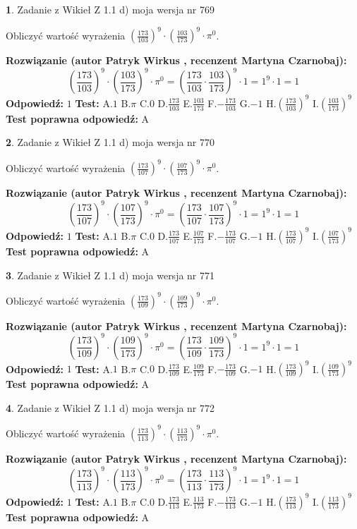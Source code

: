 \documentclass[12pt, a4paper]{article}
\theoremstyle{definition} %
\newtheorem{zad}{}
\newcommand{\zadStart}[1]{\begin{zad}#1\newline}
\newcommand{\zadStop}{\end{zad}}
\newcommand{\rozwStart}[2]{\noindent \textbf{Rozwiązanie (autor #1 , recenzent #2): }\newline}
\newcommand{\rozwStop}{\newline}
\newcommand{\odpStart}{\noindent \textbf{Odpowiedź:}\newline}
\newcommand{\odpStop}{\newline}
\newcommand{\testStart}{\noindent \textbf{Test:}\newline}
\newcommand{\testStop}{\newline}
\newcommand{\kluczStart}{\noindent \textbf{Test poprawna odpowiedź:}\newline}
\newcommand{\kluczStop}{\newline}
\begin{document}
\zadStart{Zadanie z Wikieł Z 1.1 d) moja wersja nr 769}

Obliczyć wartość wyrażenia $(\frac{173}{103})^{9} \cdot (\frac{103}{173})^{9} \cdot \pi^{0}$.
\zadStop
\rozwStart{Patryk Wirkus}{Martyna Czarnobaj}
$$(\frac{173}{103})^{9} \cdot (\frac{103}{173})^{9} \cdot \pi^{0} = (\frac{173}{103} \cdot \frac{103}{173})^{9} \cdot 1 = 1^{9} \cdot 1 = 1$$
\rozwStop
\odpStart
$1$
\odpStop
\testStart
A.$1$ B.$\pi$ C.$0$ D.$\frac{173}{103}$ E.$\frac{103}{173}$
F.$-\frac{173}{103}$ G.$-1$
H.$(\frac{173}{103})^{9}$
I.$(\frac{103}{173})^{9}$
\testStop
\kluczStart
A
\kluczStop



\zadStart{Zadanie z Wikieł Z 1.1 d) moja wersja nr 770}

Obliczyć wartość wyrażenia $(\frac{173}{107})^{9} \cdot (\frac{107}{173})^{9} \cdot \pi^{0}$.
\zadStop
\rozwStart{Patryk Wirkus}{Martyna Czarnobaj}
$$(\frac{173}{107})^{9} \cdot (\frac{107}{173})^{9} \cdot \pi^{0} = (\frac{173}{107} \cdot \frac{107}{173})^{9} \cdot 1 = 1^{9} \cdot 1 = 1$$
\rozwStop
\odpStart
$1$
\odpStop
\testStart
A.$1$ B.$\pi$ C.$0$ D.$\frac{173}{107}$ E.$\frac{107}{173}$
F.$-\frac{173}{107}$ G.$-1$
H.$(\frac{173}{107})^{9}$
I.$(\frac{107}{173})^{9}$
\testStop
\kluczStart
A
\kluczStop



\zadStart{Zadanie z Wikieł Z 1.1 d) moja wersja nr 771}

Obliczyć wartość wyrażenia $(\frac{173}{109})^{9} \cdot (\frac{109}{173})^{9} \cdot \pi^{0}$.
\zadStop
\rozwStart{Patryk Wirkus}{Martyna Czarnobaj}
$$(\frac{173}{109})^{9} \cdot (\frac{109}{173})^{9} \cdot \pi^{0} = (\frac{173}{109} \cdot \frac{109}{173})^{9} \cdot 1 = 1^{9} \cdot 1 = 1$$
\rozwStop
\odpStart
$1$
\odpStop
\testStart
A.$1$ B.$\pi$ C.$0$ D.$\frac{173}{109}$ E.$\frac{109}{173}$
F.$-\frac{173}{109}$ G.$-1$
H.$(\frac{173}{109})^{9}$
I.$(\frac{109}{173})^{9}$
\testStop
\kluczStart
A
\kluczStop



\zadStart{Zadanie z Wikieł Z 1.1 d) moja wersja nr 772}

Obliczyć wartość wyrażenia $(\frac{173}{113})^{9} \cdot (\frac{113}{173})^{9} \cdot \pi^{0}$.
\zadStop
\rozwStart{Patryk Wirkus}{Martyna Czarnobaj}
$$(\frac{173}{113})^{9} \cdot (\frac{113}{173})^{9} \cdot \pi^{0} = (\frac{173}{113} \cdot \frac{113}{173})^{9} \cdot 1 = 1^{9} \cdot 1 = 1$$
\rozwStop
\odpStart
$1$
\odpStop
\testStart
A.$1$ B.$\pi$ C.$0$ D.$\frac{173}{113}$ E.$\frac{113}{173}$
F.$-\frac{173}{113}$ G.$-1$
H.$(\frac{173}{113})^{9}$
I.$(\frac{113}{173})^{9}$
\testStop
\kluczStart
A
\kluczStop
\end{document}
